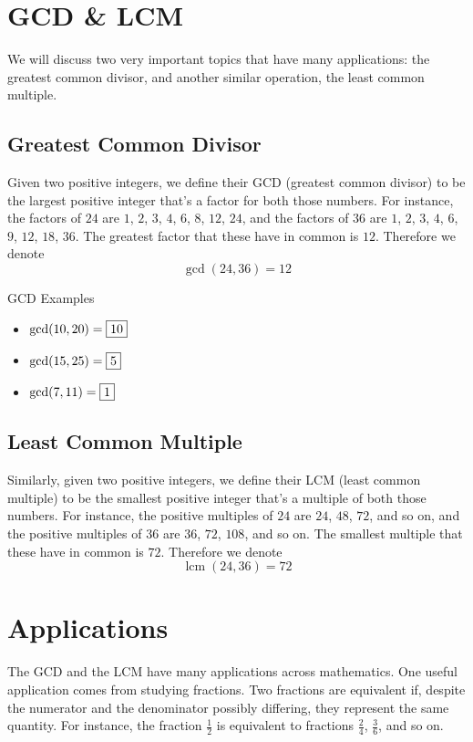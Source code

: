 \documentclass[a4paper,10pt]{report}
\begin{document}
\section{GCD \& LCM}
We will discuss two very important topics that have many applications: the
greatest common divisor, and another similar operation, the least common
multiple.

\subsection{Greatest Common Divisor}
Given two positive integers, we define their GCD (greatest common divisor) to be
the largest positive integer that's a factor for both those numbers. For
instance, the factors of $24$ are $1$, $2$, $3$, $4$, $6$, $8$, $12$, $24$, and
the factors of $36$ are $1$, $2$, $3$, $4$, $6$, $9$, $12$, $18$, $36$. The
greatest factor that these have in common is $12$. Therefore we denote \[
 \gcd(24, 36) = 12
\]

\begin{problem}{GCD Examples}
 \begin{itemize}
  \item $\gcd(10, 20) = \Ans{10}$
  \item $\gcd(15, 25) = \Ans{5}$
  \item $\gcd(7, 11) = \Ans{1}$
 \end{itemize}
\end{problem}

\subsection{Least Common Multiple}
Similarly, given two positive integers, we define their LCM (least common
multiple) to be the smallest positive integer that's a multiple of both those
numbers. For instance, the positive multiples of $24$ are $24$, $48$, $72$, and
so on, and the positive multiples of $36$ are $36$, $72$, $108$, and so on.
The smallest multiple that these have in common is $72$. Therefore we
denote \[
 \operatorname{lcm}(24, 36) = 72
\]

\section{Applications}
The GCD and the LCM have many applications across mathematics. One useful
application comes from studying fractions. Two fractions are equivalent if,
despite the numerator and the denominator possibly differing, they represent
the same quantity. For instance, the fraction $\frac{1}{2}$ is equivalent to
fractions $\frac{2}{4}$, $\frac{3}{6}$, and so on.
\end{document}
